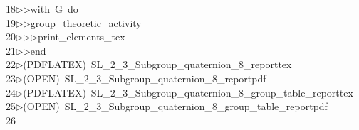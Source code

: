 \begin{tabbing}
18\>$\triangleright$\>$\triangleright$\>with\ G\ do\ \\[0pt]
19\>$\triangleright$\>$\triangleright$\>group\_theoretic\_activity\ \\[0pt]
20\>$\triangleright$\>$\triangleright$\>$\triangleright$\>print\_elements\_tex\ \\[0pt]
21\>$\triangleright$\>$\triangleright$\>end\\[0pt]
22\>$\triangleright$\>(PDFLATEX)\ SL\_2\_3\_Subgroup\_quaternion\_8\_reporttex\\[0pt]
23\>$\triangleright$\>(OPEN)\ SL\_2\_3\_Subgroup\_quaternion\_8\_reportpdf\\[0pt]
24\>$\triangleright$\>(PDFLATEX)\ SL\_2\_3\_Subgroup\_quaternion\_8\_group\_table\_reporttex\\[0pt]
25\>$\triangleright$\>(OPEN)\ SL\_2\_3\_Subgroup\_quaternion\_8\_group\_table\_reportpdf\\[0pt]
26\>\end{tabbing}
